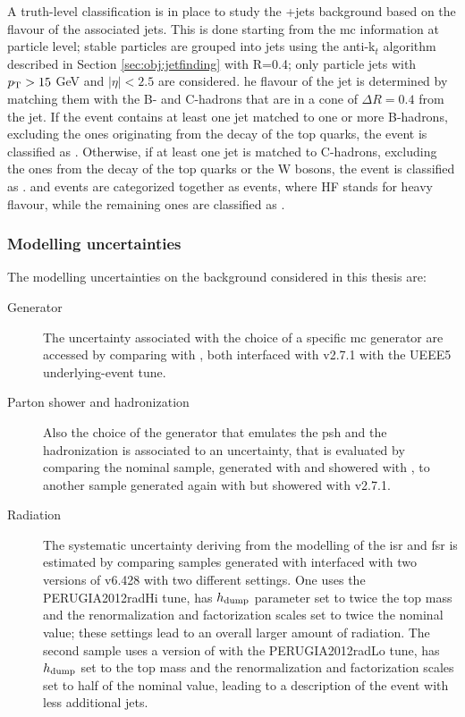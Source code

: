 A truth-level classification is in place to study the \ttbar+jets background based on the flavour of the associated jets.
This is done starting from the \gls{mc} information at particle level; stable particles are grouped into jets using the anti-k$_t$ algorithm 
described in Section \ref{sec:obj:jetfinding} with R=0.4; only particle jets with $p_{\rm T} > 15$ GeV and $|\eta|<2.5$ are considered. 
he flavour of the jet is determined by matching them with the B- and C-hadrons that are in a cone of $\Delta R = 0.4$ from the jet. 
If the event contains at least one jet matched to one or more B-hadrons, excluding the ones originating from the decay of the top quarks, the event 
is classified as \ttbb. Otherwise, if at least one jet is matched to C-hadrons, excluding the ones from the decay of the top quarks or the W bosons, the event is classified as \ttcc. \ttbb and \ttbb events are categorized together as \tthf events, where HF stands for heavy flavour, while the remaining ones are classified as \ttlight.


\subsubsection*{Modelling uncertainties}

The modelling uncertainties on the \ttbar background considered in this thesis are:
\begin{description}
\item[Generator] The uncertainty associated with the choice of a specific \gls{mc} generator are accessed by comparing \PowhegBox with \aNLO, both interfaced with \HWpp v2.7.1 with the UEEE5 underlying-event tune.

\item[Parton shower and hadronization] Also the choice of the generator that emulates the \gls{psh} and the hadronization is associated to an uncertainty, that is evaluated by comparing the nominal sample, generated with \PowhegBox and showered with \PY, to another sample generated again with \PowhegBox but showered with \HWpp v2.7.1. 

\item[Radiation] The systematic uncertainty deriving from the modelling of the \gls{isr} and \gls{fsr} is estimated by comparing samples
generated with \PowhegBox interfaced with two versions of \PY v6.428 with two different settings. One uses the PERUGIA2012radHi tune, has $h_{\rm{dump}}$ parameter set to twice the top mass and the renormalization and factorization scales set to twice the nominal value; these settings lead to an overall larger amount of radiation. The second sample uses a version of \PY with the PERUGIA2012radLo tune, has $h_{\rm{dump}}$ set to the top mass and the renormalization and factorization scales set to half of the nominal value, leading to a description of the event with less additional jets. 

\end{description}

